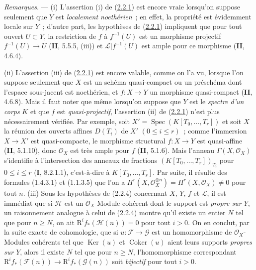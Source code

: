 \begin{env}[2.2.5]
\label{III.2.2.5-fr}
\emph{Remarques.} ---
(i) L'assertion (i) de (\hyperref[III.2.2.1-fr]{2.2.1}) est encore vraie
lorsqu'on suppose seulement que $Y$ est \emph{localement noethérien}~; en
effet, la propriété est évidemment locale sur $Y$~; d'autre part, les
hypothèses de (\hyperref[III.2.2.1-fr]{2.2.1}) impliquent que pour tout
ouvert $U\subset Y$, la restriction de $f$ à $f^{-1}(U)$ est un morphisme
projectif $f^{-1}(U)\to U$ (\textbf{II}, 5.5.5, (iii)) et
$\mathcal L|f^{-1}(U)$ est ample pour ce morphisme (\textbf{II}, 4.6.4).

(ii) L'assertion (iii) de (\hyperref[III.2.2.1-fr]{2.2.1}) est encore
valable, comme on l'a vu, lorsque l'on suppose seulement que $X$ est un
schéma quasi-compact ou un préschéma dont l'espace sous-jacent est
noethérien, et $f:X\to Y$ un morphisme quasi-compact (\textbf{II}, 4.6.8). Mais il
faut noter que même lorsqu'on suppose que $Y$ est le \emph{spectre d'un
corps} $K$ et que $f$ est \emph{quasi-projectif}, l'assertion (ii) de
(\hyperref[III.2.2.1-fr]{2.2.1}) n'est plus nécessairement vérifiée. Par
exemple, soit $X'=\operatorname{Spec}(K[T_0,\ldots,T_r])$ et soit $X$ la
réunion des ouverts affines $D(T_i)$ de $X'$ $(0\leq i\leq r)$~; comme
l'immersion $X\to X'$ est quasi-compacte, le morphisme structural
$f:X\to Y$ est quasi-affine (\textbf{II}, 5.1.10), donc $\mathcal O_X$ est très
ample pour $f$ (\textbf{II}, 5.1.6). Mais l'anneau
$\Gamma(X,\mathcal O_X)$ s'identifie à l'intersection des anneaux de
fractions $(K[T_0,\ldots,T_r])_{T_i}$ pour $0\leq i\leq r$
(\textbf{I}, 8.2.1.1), c'est-à-dire à $K[T_0,\ldots,T_r]$. Par suite, il résulte
des formules (1.4.3.1) et (1.1.3.5) que l'on a
$H^r(X,\mathcal O_X^{\otimes n})=H^r(X,\mathcal O_X)\neq0$ pour tout
$n$.
(iii) Sous les hypothèses de (2.2.4) concernant $X$, $Y$, $f$ et $\mathcal L$,
il est immédiat que si $\mathcal H$ est un $\mathcal O_X$-Module cohérent dont
le support est \emph{propre sur $Y$}, un raisonnement analogue à celui de
(2.2.4) montre qu'il existe un entier $N$ tel que pour $n\geq N$, on ait
$\mathrm R^if_*(\mathcal H(n))=0$ pour tout $i>0$. On en conclut, par la suite
exacte de cohomologie, que si $u:\mathcal F\to\mathcal G$ est un homomorphisme
de $\mathcal O_X$-Modules cohérents tel que $\operatorname{Ker}(u)$ et
$\operatorname{Coker}(u)$ aient leurs supports \emph{propres sur $Y$}, alors il
existe $N$ tel que pour $n\geq N$, l'homomorphisme correspondant
$\mathrm R^if_*(\mathcal F(n))\to\mathrm R^if_*(\mathcal G(n))$ soit
\emph{bijectif} pour tout $i>0$.
\end{env}

